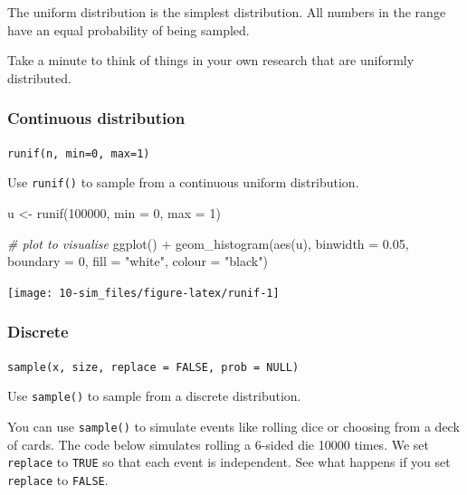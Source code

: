 \documentclass[
  oneside]{book}
\newenvironment{Shaded}{\begin{snugshade}}{\end{snugshade}}
\newcommand{\AttributeTok}[1]{\textcolor[rgb]{0.77,0.63,0.00}{#1}}
\newcommand{\CommentTok}[1]{\textcolor[rgb]{0.56,0.35,0.01}{\textit{#1}}}
\newcommand{\DecValTok}[1]{\textcolor[rgb]{0.00,0.00,0.81}{#1}}
\newcommand{\FloatTok}[1]{\textcolor[rgb]{0.00,0.00,0.81}{#1}}
\newcommand{\FunctionTok}[1]{\textcolor[rgb]{0.00,0.00,0.00}{#1}}
\newcommand{\NormalTok}[1]{#1}
\newcommand{\OtherTok}[1]{\textcolor[rgb]{0.56,0.35,0.01}{#1}}
\newcommand{\SpecialCharTok}[1]{\textcolor[rgb]{0.00,0.00,0.00}{#1}}
\newcommand{\StringTok}[1]{\textcolor[rgb]{0.31,0.60,0.02}{#1}}
\begin{document}
The uniform distribution is the simplest distribution. All numbers in the range have an equal probability of being sampled.

\begin{try}
Take a minute to think of things in your own research that are uniformly distributed.

\end{try}

\hypertarget{continuous-distribution}{%
\subsubsection{Continuous distribution}\label{continuous-distribution}}

\texttt{runif(n,\ min=0,\ max=1)}

Use \texttt{runif()} to sample from a continuous uniform distribution.

\begin{Shaded}
\begin{Highlighting}[]
\NormalTok{u }\OtherTok{\textless{}{-}} \FunctionTok{runif}\NormalTok{(}\DecValTok{100000}\NormalTok{, }\AttributeTok{min =} \DecValTok{0}\NormalTok{, }\AttributeTok{max =} \DecValTok{1}\NormalTok{)}

\CommentTok{\# plot to visualise}
\FunctionTok{ggplot}\NormalTok{() }\SpecialCharTok{+} 
  \FunctionTok{geom\_histogram}\NormalTok{(}\FunctionTok{aes}\NormalTok{(u), }\AttributeTok{binwidth =} \FloatTok{0.05}\NormalTok{, }\AttributeTok{boundary =} \DecValTok{0}\NormalTok{,}
                 \AttributeTok{fill =} \StringTok{"white"}\NormalTok{, }\AttributeTok{colour =} \StringTok{"black"}\NormalTok{)}
\end{Highlighting}
\end{Shaded}

\begin{center}\texttt{[image: 10-sim\_files/figure-latex/runif-1]} \end{center}

\hypertarget{discrete}{%
\subsubsection{Discrete}\label{discrete}}

\texttt{sample(x,\ size,\ replace\ =\ FALSE,\ prob\ =\ NULL)}

Use \texttt{sample()} to sample from a discrete distribution.

You can use \texttt{sample()} to simulate events like rolling dice or choosing from a deck of cards. The code below simulates rolling a 6-sided die 10000 times. We set \texttt{replace} to \texttt{TRUE} so that each event is independent. See what happens if you set \texttt{replace} to \texttt{FALSE}.
\end{document}
